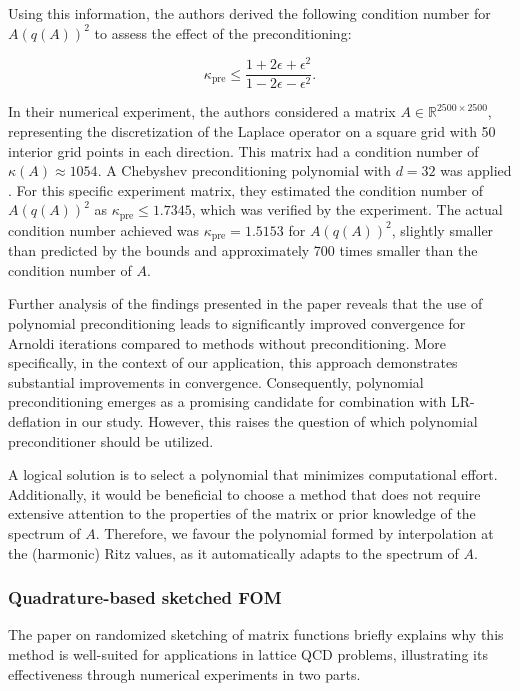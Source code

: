 Using this information, the authors derived the following condition number for $A(q(A))^{2}$ to assess the effect of the preconditioning:

\[
    \kappa_{\text{pre}} \leq \frac{1+2\epsilon+\epsilon^{2}}{1-2\epsilon-\epsilon^{2}}.
\]

In their numerical experiment, the authors considered a matrix $A \in \mathbb{R}^{2500 \times 2500}$, representing the discretization of the Laplace operator on a square grid with 50 interior grid points in each direction. This matrix had a condition number of $\kappa(A) \approx 1054$. A Chebyshev preconditioning polynomial with $d = 32$ was applied \cite{49}. For this specific experiment matrix, they estimated the condition number of $A(q(A))^2$ as $\kappa_{\text{pre}} \leq 1.7345$, which was verified by the experiment. The actual condition number achieved was $\kappa_{\text{pre}} = 1.5153$ for $A(q(A))^2$, slightly smaller than predicted by the bounds and approximately 700 times smaller than the condition number of $A$.

Further analysis of the findings presented in the paper \cite{49} reveals that the use of polynomial preconditioning leads to significantly improved convergence for Arnoldi iterations compared to methods without preconditioning. More specifically, in the context of our application, this approach demonstrates substantial improvements in convergence. Consequently, polynomial preconditioning emerges as a promising candidate for combination with LR-deflation in our study. However, this raises the question of which polynomial preconditioner should be utilized.

A logical solution is to select a polynomial that minimizes computational effort. Additionally, it would be beneficial to choose a method that does not require extensive attention to the properties of the matrix or prior knowledge of the spectrum of $A$. Therefore, we favour the polynomial formed by interpolation at the (harmonic) Ritz values, as it automatically adapts to the spectrum of $A$.

\subsubsection{Quadrature-based sketched FOM}
\label{sec:quad_sketch_FOM}

The paper on randomized sketching of matrix functions \cite{41} briefly explains why this method is well-suited for applications in lattice QCD problems, illustrating its effectiveness through numerical experiments in two parts.

